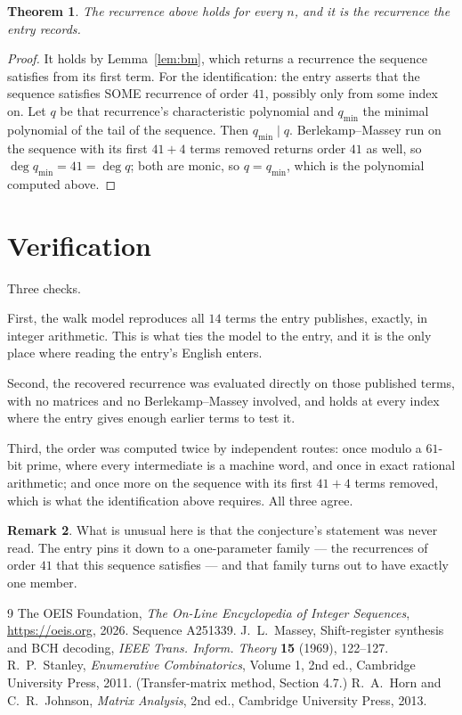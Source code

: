 \documentclass[11pt,a4paper]{article}
\theoremstyle{plain}
\newtheorem{theorem}{Theorem}
\theoremstyle{definition}
\newtheorem{remark}[theorem]{Remark}
\begin{document}
\begin{theorem}
The recurrence above holds for every $n$, and it is the recurrence the entry records.
\end{theorem}

\begin{proof}
It holds by Lemma~\ref{lem:bm}, which returns a recurrence the sequence satisfies from its
first term. For the identification: the entry asserts that the sequence satisfies SOME
recurrence of order $41$, possibly only from some index on. Let $q$ be that recurrence's
characteristic polynomial and $q_{\min}$ the minimal polynomial of the tail of the sequence.
Then $q_{\min}\mid q$. Berlekamp--Massey run on the sequence with its first $41+4$ terms
removed returns order $41$ as well, so $\deg q_{\min}=41=\deg q$; both are monic, so
$q=q_{\min}$, which is the polynomial computed above.
\end{proof}

\section{Verification}

Three checks.

First, the walk model reproduces all $14$ terms the entry publishes, exactly, in integer
arithmetic. This is what ties the model to the entry, and it is the only place where reading
the entry's English enters.

Second, the recovered recurrence was evaluated directly on those published terms, with no
matrices and no Berlekamp--Massey involved, and holds at every index where the entry gives
enough earlier terms to test it.

Third, the order was computed twice by independent routes: once modulo a $61$-bit prime, where
every intermediate is a machine word, and once in exact rational arithmetic; and once more on
the sequence with its first $41+4$ terms removed, which is what the identification above
requires. All three agree.

\begin{remark}
What is unusual here is that the conjecture's statement was never read. The entry pins it down
to a one-parameter family --- the recurrences of order $41$ that this sequence satisfies
--- and that family turns out to have exactly one member.
\end{remark}

\begin{thebibliography}{9}
 The OEIS Foundation, \emph{The On-Line Encyclopedia of Integer
Sequences}, \url{https://oeis.org}, 2026. Sequence A251339.
 J.~L.~Massey, Shift-register synthesis and BCH decoding, \emph{IEEE
Trans. Inform. Theory} \textbf{15} (1969), 122--127.
 R.~P.~Stanley, \emph{Enumerative Combinatorics}, Volume 1, 2nd ed.,
Cambridge University Press, 2011. (Transfer-matrix method, Section 4.7.)
 R.~A.~Horn and C.~R.~Johnson, \emph{Matrix Analysis}, 2nd ed., Cambridge
University Press, 2013.
\end{thebibliography}
\end{document}
